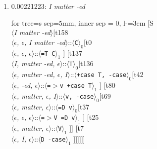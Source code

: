 \documentclass[11pt]{article}
\begin{document}
\begin{enumerate}
	\item  0.00221223: \textit{I matter -ed} \\[0.5em]
	\begin{forest}
	for tree={s sep=5mm, inner sep = 0, l-=3em}
	[S\\$\langle$\textit{I matter -ed}$\rangle$[t158\\$\langle$\textit{$\epsilon${,} $\epsilon${,} I matter -ed}$\rangle$::$\langle$\texttt{C}$\rangle_0$[t0\\$\langle$\textit{$\epsilon${,} $\epsilon${,} $\epsilon$}$\rangle$::$\langle$\texttt{{=}T C}$\rangle_1$ ] [t137\\$\langle$\textit{I{,} matter -ed{,} $\epsilon$}$\rangle$::$\langle$\texttt{T}$\rangle_0$[t136\\$\langle$\textit{$\epsilon${,} matter -ed{,} $\epsilon${,} I}$\rangle$::$\langle$\texttt{+case T{,} -case}$\rangle_0$[t42\\$\langle$\textit{$\epsilon${,} -ed{,} $\epsilon$}$\rangle$::$\langle$\texttt{{=}$>$v +case T}$\rangle_1$ ] [t80\\$\langle$\textit{$\epsilon${,} matter{,} $\epsilon${,} I}$\rangle$::$\langle$\texttt{v{,} -case}$\rangle_0$[t69\\$\langle$\textit{$\epsilon${,} matter{,} $\epsilon$}$\rangle$::$\langle$\texttt{{=}D v}$\rangle_0$[t37\\$\langle$\textit{$\epsilon${,} $\epsilon${,} $\epsilon$}$\rangle$::$\langle$\texttt{{=}$>$V {=}D v}$\rangle_1$ ] [t25\\$\langle$\textit{$\epsilon${,} matter{,} $\epsilon$}$\rangle$::$\langle$\texttt{V}$\rangle_1$ ]] [t7\\$\langle$\textit{$\epsilon${,} I{,} $\epsilon$}$\rangle$::$\langle$\texttt{D -case}$\rangle_1$ ]]]]]]
	\end{forest}
	\newpage


\end{enumerate}
\end{document}
